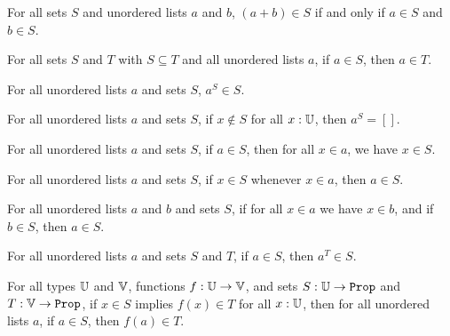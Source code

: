 \documentclass[../../math.tex]{subfiles}
\begin{document}
\begin{theorem} \label{ulist_prop_conc}
    For all sets $S$ and unordered lists $a$ and $b$, $(a + b) \in S$ if and
    only if $a \in S$ and $b \in S$.
\end{theorem}

\begin{theorem} \label{ulist_prop_sub}
    For all sets $S$ and $T$ with $S \subseteq T$ and all unordered lists $a$,
    if $a \in S$, then $a \in T$.
\end{theorem}

\begin{theorem} \label{ulist_prop_filter}
    For all unordered lists $a$ and sets $S$, $a^S \in S$.
\end{theorem}

\begin{theorem} \label{ulist_prop_filter_empty}
    For all unordered lists $a$ and sets $S$, if $x \notin S$ for all $x : \mathbb{U}$,
    then $a^S = []$.
\end{theorem}

\begin{theorem} \label{ulist_prop_in}
    For all unordered lists $a$ and sets $S$, if $a \in S$, then for all $x \in
    a$, we have $x \in S$.
\end{theorem}

\begin{theorem} \label{ulist_in_prop}
    For all unordered lists $a$ and sets $S$, if $x \in S$ whenever $x \in a$,
    then $a \in S$.
\end{theorem}

\begin{theorem} \label{ulist_prop_in_sub}
    For all unordered lists $a$ and $b$ and sets $S$, if for all $x \in a$ we
    have $x \in b$, and if $b \in S$, then $a \in S$.
\end{theorem}

\begin{theorem} \label{ulist_prop_other_filter}
    For all unordered lists $a$ and sets $S$ and $T$, if $a \in S$, then $a^T
    \in S$.
\end{theorem}

\begin{theorem} \label{ulist_prop_image}
    For all types $\mathbb{U}$ and $\mathbb{V}$, functions $f : \mathbb{U} \to \mathbb{V}$, and sets $S : \U \to
    \Prop$ and $T : \V \to \Prop$, if $x \in S$ implies $f(x) \in T$ for all $x
    : \mathbb{U}$, then for all unordered lists $a$, if $a \in S$, then $f(a) \in T$.
\end{theorem}
\end{document}
